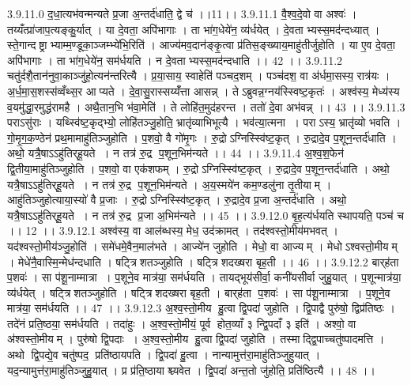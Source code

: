 3.9.11.0
द॒धा॒त्यभ॑वन्मन्यते प्र॒जा अ॒न्तर्द॑धाति॒ द्वे च॑ ।।11।।
3.9.11.1
वै॒श्व॒दे॒वो वा अश्वः॑ । तय्यँत्प्रा॑जाप॒त्यङ्कु॒र्यात् । या दे॒वता॒ अपि॑भागाः । ता भा॑ग॒धेये॑न॒ व्य॑र्धयेत् । दे॒वताभ्यस्स॒मद॑न्दध्यात् । स्ते॒गान्दष्ट्राभ्याम्म॒ण्डूका॒ञ्जम्भ्ये॑भि॒रिति॑ । आज्य॑मव॒दान॑ङ्कृ॒त्वा प्र॑तिस॒ङ्ख्याय॒माहु॑तीर्जुहोति । या ए॒व दे॒वता॒ अपि॑भागाः । ता भा॑ग॒धेये॑न॒ सम॑र्धयति । न दे॒वताभ्यस्स॒मद॑न्दधाति ।। 42 ।।
3.9.11.2
चतु॑र्दशै॒तान॑नुवा॒काञ्जु॑हो॒त्यन॑न्तरित्यै । प्र॒या॒साय॒ स्वाहेति॑ पञ्चद॒शम् । पञ्च॑दश॒ वा अ॑र्धमा॒सस्य॒ रात्र॑यः । अ॒र्ध॒मा॒स॒शस्स॑व्वँथ्स॒र आप्यते । दे॒वा॒सु॒रास्सय्यँ॑त्ता आसन्न् । तेऽब्रुवन्न॒ग्नय॑स्स्विष्ट॒कृतः॑ । अश्व॑स्य॒ मेध्य॑स्य व॒यमु॑द्धा॒रमुद्ध॑रामहै । अथै॒तान॒भि भ॑वा॒मेति॑ । ते लोहि॑त॒मुद॑हरन्त । ततो॑ दे॒वा अभ॑वन्न् ।। 43 ।।
3.9.11.3
पराऽसु॑राः । यथ्स्वि॑ष्ट॒कृद्भ्यो॒ लोहि॑तञ्जु॒होति॒ भ्रातृ॑व्याभिभूत्यै । भव॑त्या॒त्मना । पराऽस्य॒ भ्रातृ॑व्यो भवति । गो॒मृ॒ग॒क॒ण्ठेन॑ प्रथ॒मामाहु॑तिञ्जुहोति । प॒शवो॒ वै गो॑मृ॒गः । रु॒द्रोऽग्निस्स्वि॑ष्ट॒कृत् । रु॒द्रादे॒व प॒शून॒न्तर्द॑धाति । अथो॒ यत्रै॒षाऽऽहु॑तिर्‌हू॒यते । न तत्र॑ रु॒द्र प॒शून॒भिम॑न्यते ।। 44 ।।
3.9.11.4
अ॒श्व॒श॒फेन॑ द्वि॒तीया॒माहु॑तिञ्जुहोति । प॒शवो॒ वा एक॑शफम् । रु॒द्रोऽग्निस्स्वि॑ष्ट॒कृत् । रु॒द्रादे॒व प॒शून॒न्तर्द॑धाति । अथो॒ यत्रै॒षाऽऽहु॑तिर्‌हू॒यते । न तत्र॑ रु॒द्र प॒शून॒भिम॑न्यते । अ॒य॒स्मये॑न कम॒ण्डलु॑ना तृ॒तीयाम् । आहु॑तिञ्जुहोत्याया॒स्यो॑ वै प्र॒जाः । रु॒द्रोऽग्निस्स्वि॑ष्ट॒कृत् । रु॒द्रादे॒व प्र॒जा अ॒न्तर्द॑धाति । अथो॒ यत्रै॒षाऽऽहु॑तिर्‌हू॒यते । न तत्र॑ रु॒द्र प्र॒जा अ॒भिम॑न्यते ।। 45 ।।
3.9.12.0
बृ॒ह॒त्य॑र्धयति स्थापयति॒ पञ्च॑ च ।। 12 ।।
3.9.12.1
अश्व॑स्य॒ वा आल॑ब्धस्य॒ मेध॒ उद॑क्रामत् । तद॑श्वस्तो॒मीय॑मभवत् । यद॑श्वस्तो॒मीय॑ञ्जु॒होति॑ । समे॑धमे॒वैन॒माल॑भते । आज्ये॑न जुहोति । मेधो॒ वा आज्यम् । मेधोऽश्वस्तो॒मीयम् । मेधे॑नै॒वास्मि॒न्मेध॑न्दधाति । षट्त्रि॑शतञ्जुहोति । षट्त्रि॑शदख्षरा बृह॒ती ।। 46 ।।
3.9.12.2
बार्‌ह॑ता प॒शवः॑ । सा प॑शू॒नाम्मात्रा । प॒शूने॒व मात्र॑या॒ सम॑र्धयति । तायद्भूय॑सीर्वा॒ कनी॑यसीर्वा जुहु॒यात् । प॒शून्मात्र॑या॒ व्य॑र्धयेत् । षट्त्रि॑शतञ्जुहोति । षट्त्रि॑शदख्षरा बृह॒ती । बार्‌ह॑ता प॒शवः॑ । सा प॑शू॒नाम्मात्रा । प॒शूने॒व मात्र॑या॒ सम॑र्धयति ।। 47 ।।
3.9.12.3
अ॒श्व॒स्तो॒मीय॑ हु॒त्वा द्वि॒पदा॑ जुहोति । द्वि॒पाद्वै पुरु॑षो॒ द्विप्र॑तिष्ठः । तदे॑नं प्रति॒ष्ठया॒ सम॑र्धयति । तदा॑हुः । अ॒श्व॒स्तो॒मीयं॒ पूर्व॑ होत॒व्याँ ३ न्द्वि॒पदाँ ३ इति॑ । अश्वो॒ वा अ॑श्वस्तो॒मीयम् । पुरु॑षो द्वि॒पदाः । अ॒श्व॒स्तो॒मीय॑ हु॒त्वा द्वि॒पदा॑ जुहोति । तस्माद्द्वि॒पाच्चतु॑ष्पादमत्ति । अथो द्वि॒पद्ये॒व चतु॑ष्पद॒ प्रति॑ष्ठायपति । द्वि॒पदा॑ हु॒त्वा । नान्यामुत्त॑रा॒माहु॑तिञ्जुहुयात् । यद॒न्यामुत्त॑रा॒माहु॑तिञ्जुहु॒यात् । प्र प्र॑ति॒ष्ठायाश्च्यवेत । द्वि॒पदा॑ अन्त॒तो जु॑होति॒ प्रति॑ष्ठित्यै ।। 48 ।।
